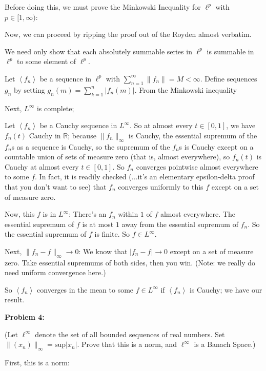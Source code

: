 \documentclass[a4paper,12pt]{article}
\newcommand{\tab}{\hspace{4mm}} %
\newcommand{\shunt}{\vspace{20mm}}
\newcommand{\absval}[1]{\left\lvert #1 \right\rvert}
\newcommand{\norm}[1]{\|#1\|}
\newcommand{\anbrack}[1]{\left\langle #1 \right\rangle}
\newcommand{\R}{\mathbb{R}}
\begin{document}
Before doing this, we must prove the Minkowski Inequality for $\ell^p$ with $p \in [1,\infty)$:

\tab %

Now, we can proceed by ripping the proof out of the Royden almost verbatim.

\tab We need only show that each absolutely summable series in $\ell^p$ is summable in $\ell^p$ to some element of $\ell^p$.

\tab Let $\anbrack{f_n}$ be a sequence in $\ell^p$ with $\sum\limits_{n=1}^\infty \norm{f_n} = M < \infty$. Define sequences $g_n$ by setting $g_n(m) = \sum\limits_{k=1}^n \absval{f_n(m)}$. From the Minkowski inequality %

Next, $L^\infty$ is complete;

\tab Let $\anbrack{f_n}$ be a Cauchy sequence in $L^\infty$. So at almost every $t \in [0,1]$, we have $f_n(t)$ Cauchy in $\R$; because $\norm{f_n}_\infty$ is Cauchy, the essential supremum of the $f_n$s as a sequence is Cauchy, so the supremum of the $f_n$s is Cauchy except on a countable union of sets of measure zero (that is, almost everywhere), so $f_n(t)$ is Cauchy at almost every $t \in [0,1]$. So $f_n$ converges pointwise almost everywhere to some $f$. In fact, it is readily checked (...it's an elementary epsilon-delta proof that you don't want to see) that $f_n$ converges uniformly to this $f$ except on a set of measure zero.

\tab Now, this $f$ is in $L^\infty$: There's an $f_n$ within $1$ of $f$ almost everywhere. The essential supremum of $f$ is at most $1$ away from the essential supremum of $f_n$. So the essential supremum of $f$ is finite. So $f \in L^\infty$.

\tab Next, $\norm{f_n - f}_\infty \to 0$: We know that $\absval{f_n-f} \to 0$ except on a set of measure zero. Take essential supremums of both sides, then you win. (Note: we really do need uniform convergence here.)

\tab So $\anbrack{f_n}$ converges in the mean to some $f \in L^\infty$ if $\anbrack{f_n}$ is Cauchy; we have our result.

\shunt

{\bf Problem 4:} 

(Let $\ell^\infty$ denote the set of all bounded sequences of real numbers. Set $\norm{(x_n)}_\infty = \text{sup}\absval{x_n}$. Prove that this is a norm, and $\ell^\infty$ is a Banach Space.)

First, this is a norm:
\end{document}
